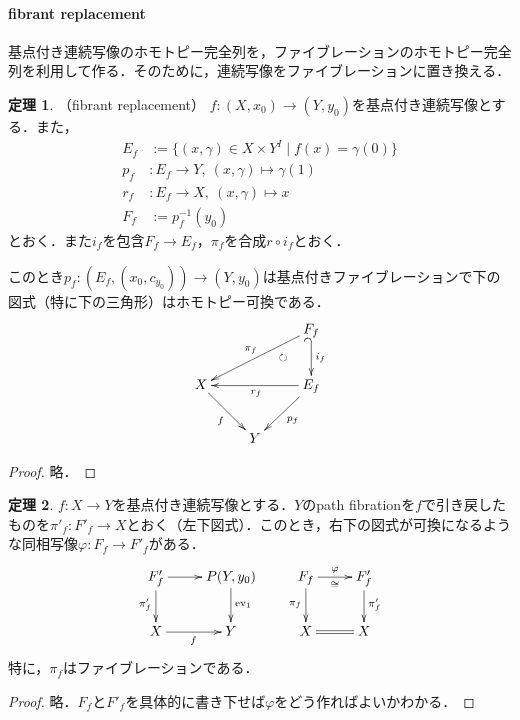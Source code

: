 \documentclass[a4paper,11pt]{jsarticle}
\theoremstyle{definition}
\newtheorem{thm}{定理}[section]
\begin{document}
\paragraph{fibrant replacement}
基点付き連続写像のホモトピー完全列を，ファイブレーションのホモトピー完全列を利用して作る．そのために，連続写像をファイブレーションに置き換える．
\begin{thm}（fibrant replacement）
  $f\colon (X,x_0)\to (Y,y_0)$を基点付き連続写像とする．また，\begin{align*}
    E_f&:=\{(x,\gamma)\in X\times Y^I\mid f(x)=\gamma(0)\}\\
    p_f&\colon E_f\to Y,\ (x,\gamma)\mapsto \gamma(1)\\
    r_f&\colon E_f\to X,\ (x,\gamma)\mapsto x\\
    F_f&:=p_f^{-1}(y_0)
  \end{align*}
  とおく．また$i_f$を包含$F_f\to E_f$，$\pi_f$を合成$r\circ i_f$とおく．
  
  このとき$p_f\colon (E_f,(x_0,c_{y_0}))\to(Y,y_0)$は基点付きファイブレーションで下の図式（特に下の三角形）はホモトピー可換である．
  \[\xymatrix{
    &&F_f\ar@{_(->}[d]^{i_f}\ar[lld]_{\pi_f}\\
    X\ar[dr]_f & \ar@{}[ur]|{\circlearrowright}&E_f\ar[ll]^{r_f} \ar[dl]^{p_f}\\
    &Y&
  }\]
\end{thm}
  \begin{proof}
    略．
  \end{proof}
  \begin{thm}$f\colon X\to Y$を基点付き連続写像とする．$Y$のpath fibrationを$f$で引き戻したものを$\pi'_f\colon F'_f\to X$とおく（左下図式）．このとき，右下の図式が可換になるような同相写像$\varphi\colon F_f\to F'_f$がある．
    \[
    \xymatrix{
      F'_f\ar[d]_{\pi'_f}\ar[r]&P(Y,y_0)\ar[d]^{\mathrm{ev}_1}&F_f\ar[r]^{\varphi}_{\cong}\ar[d]_{\pi_f}&F'_f\ar[d]^{\pi'_f}\\
      X\ar[r]_f&Y&X\ar@{=}[r]&X
    }  
    \]
    特に，$\pi_f$はファイブレーションである．
  \end{thm}
  \begin{proof}
    略．$F_f$と$F'_f$を具体的に書き下せば$\varphi$をどう作ればよいかわかる．
  \end{proof}
\end{document}
